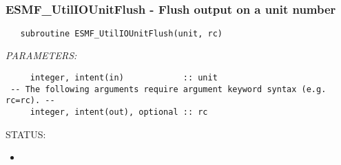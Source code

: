  
\setlength{\oldparskip}{\parskip}
\setlength{\parskip}{1.5ex}
\setlength{\oldparindent}{\parindent}
\setlength{\parindent}{0pt}
\setlength{\oldbaselineskip}{\baselineskip}
\setlength{\baselineskip}{11pt}
 
\def\bv{\begin{verbatim}}
\def\ev{\end{verbatim}}
\def\be{\begin{equation}}
\def\ee{\end{equation}}
\def\bea{\begin{eqnarray}}
\def\eea{\end{eqnarray}}
\def\bi{\begin{itemize}}
\def\ei{\end{itemize}}
\def\bn{\begin{enumerate}}
\def\en{\end{enumerate}}
\def\bd{\begin{description}}
\def\ed{\end{description}}
\def\({\left (}
\def\){\right )}
\def\[{\left [}
\def\]{\right ]}
\def\<{\left  \langle}
\def\>{\right \rangle}
\def\cI{{\cal I}}
\def\diag{\mathop{\rm diag}}
\def\tr{\mathop{\rm tr}}


 

  
 
\mbox{}\hrulefill\ 
 
\subsubsection [ESMF\_UtilIOUnitFlush] {ESMF\_UtilIOUnitFlush - Flush output on a unit number}


  
\begin{verbatim}   subroutine ESMF_UtilIOUnitFlush(unit, rc)\end{verbatim}{\em PARAMETERS:}
\begin{verbatim}     integer, intent(in)            :: unit
 -- The following arguments require argument keyword syntax (e.g. rc=rc). --
     integer, intent(out), optional :: rc\end{verbatim}
{\sf STATUS:}
   \begin{itemize}
   \item{}
   \end{itemize}
  
